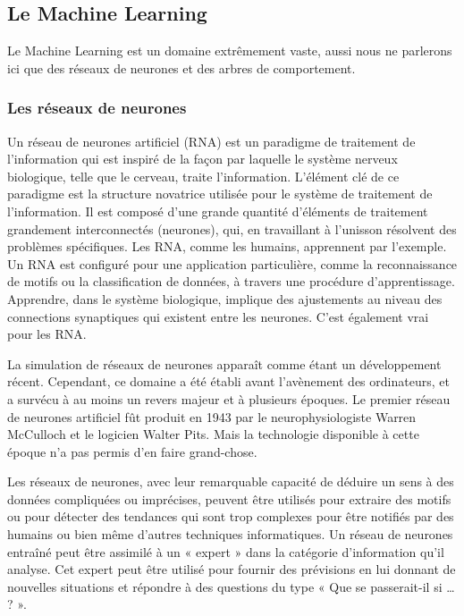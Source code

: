 \documentclass[a4paper, 12pt]{article} %
\begin{document}
\subsection{Le Machine Learning}

Le Machine Learning est un domaine extrêmement vaste, aussi nous ne parlerons ici que des réseaux de neurones et des arbres de comportement.

\subsubsection{Les réseaux de neurones}

Un réseau de neurones artificiel (RNA) est un paradigme de traitement de l’information qui est inspiré de la façon par laquelle le système nerveux biologique, telle que le cerveau, traite l’information. L’élément clé de ce paradigme est la structure novatrice utilisée pour le système de traitement de l’information. Il est composé d’une grande quantité d’éléments de traitement grandement interconnectés (neurones), qui, en travaillant à l’unisson résolvent des problèmes spécifiques. Les RNA, comme les humains, apprennent par l’exemple. Un RNA est configuré pour une application particulière, comme la reconnaissance de motifs ou la classification de données, à travers une procédure d’apprentissage. Apprendre, dans le système biologique, implique des ajustements au niveau des connections synaptiques qui existent entre les neurones. C’est également vrai pour les RNA.

La simulation de réseaux de neurones apparaît comme étant un développement récent. Cependant, ce domaine a été établi avant l’avènement des ordinateurs, et a survécu à au moins un revers majeur et à plusieurs époques. Le premier réseau de neurones artificiel fût produit en 1943 par le neurophysiologiste Warren McCulloch et le logicien Walter Pits. Mais la technologie disponible à cette époque n’a pas permis d’en faire grand-chose.

\newpage
Les réseaux de neurones, avec leur remarquable capacité de déduire un sens à des données compliquées ou imprécises, peuvent être utilisés pour extraire des motifs ou pour détecter des tendances qui sont trop complexes pour être notifiés par des humains ou bien même d’autres techniques informatiques. Un réseau de neurones entraîné peut être assimilé à un « expert » dans la catégorie d’information qu’il analyse. Cet expert peut être utilisé pour fournir des prévisions en lui donnant de nouvelles situations et répondre à des questions du type « Que se passerait-il si … ? ».
\end{document}
